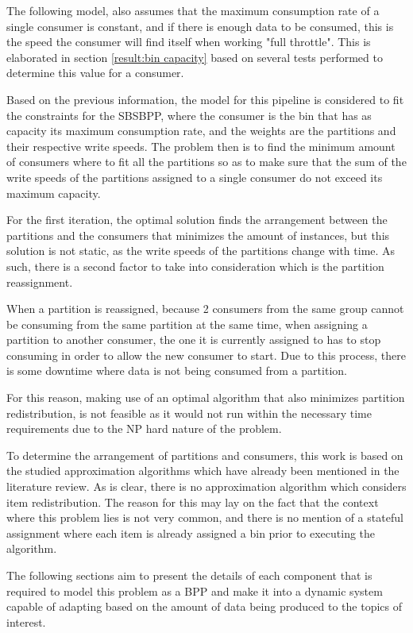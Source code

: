 The following model, also assumes that the maximum consumption rate of a single consumer is constant, and if there is enough data to be consumed, this is the speed the consumer will find itself when working "full throttle". This is elaborated in section \ref{result:bin capacity} based on several tests performed to determine this value for a consumer. 

Based on the previous information, the model for this pipeline is considered to fit the constraints for the SBSBPP, where the consumer is the bin that has as capacity its maximum consumption rate, and the weights are the partitions and their respective write speeds. The problem then is to find the minimum amount of consumers where to fit all the partitions so as to make sure that the sum of the write speeds of the partitions assigned to a single consumer do not exceed its maximum capacity. 

For the first iteration, the optimal solution finds the arrangement between the partitions and the consumers that minimizes the amount of instances, but this solution is not static, as the write speeds of the partitions change with time. As such, there is a second factor to take into consideration which is the partition reassignment. 

When a partition is reassigned, because 2 consumers from the same group cannot be consuming from the same partition at the same time, when assigning a partition to another consumer, the one it is currently assigned to has to stop consuming in order to allow the new consumer to start. Due to this process, there is some downtime where data is not being consumed from a partition.

For this reason, making use of an optimal algorithm that also minimizes partition redistribution, is not feasible as it would not run within the necessary time requirements due to the NP hard nature of the problem. 

To determine the arrangement of partitions and consumers, this work is based on the studied approximation algorithms which have already been mentioned in the literature review. As is clear, there is no approximation algorithm which considers item redistribution. The reason for this may lay on the fact that the context where this problem lies is not very common, and there is no mention of a stateful assignment where each item is already assigned a bin prior to executing the algorithm.

The following sections aim to present the details of each component that is required to model this problem as a BPP and make it into a dynamic system capable of adapting based on the amount of data being produced to the topics of interest.

